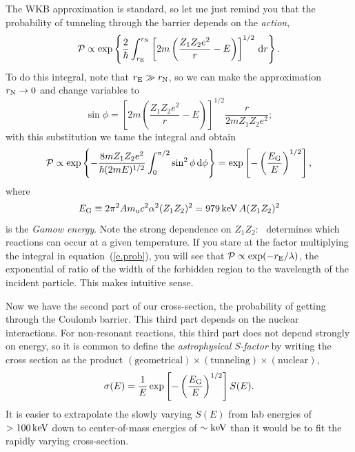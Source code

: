 The WKB approximation is standard, so let me just remind you that the probability of tunneling through the barrier depends on the \emph{action},
\begin{equation}\label{e.wkb}
\mathcal{P} \propto \exp\left\{\frac{2}{\hbar}\int_{r_{\mathrm{E}}}^{r_{\mathrm{N}}}\left[2m\left(\frac{Z_{1}Z_{2}e^{2}}{r}-E\right) \right]^{1/2}\,\mathrm{d} r\right\}.
\end{equation}
To do this integral, note that $r_{\mathrm{E}}\gg r_{\mathrm{N}}$, so we can make the approximation $r_{\mathrm{N}}\to 0$ and change variables to
\[
\sin\phi = \left[2m\left(\frac{Z_{1}Z_{2}e^{2}}{r}-E\right) \right]^{1/2}\frac{r}{2mZ_{1}Z_{2}e^{2}};
\]
with this substitution we tame the integral and obtain
\begin{equation}\label{e.prob}
\mathcal{P} \propto \exp\left\{-\frac{8mZ_{1}Z_{2}e^{2}}{\hbar(2mE)^{1/2}}\int_{0}^{\pi/2}\sin^{2}\phi\,\mathrm{d}\phi\right\} = \exp\left[-\left(\frac{E_{\mathrm{G}}}{E}\right)^{1/2}\right],
\end{equation}
where
\begin{equation}\label{e.EGamow}
E_{\mathrm{G}}\equiv 2\pi^{2} A m_\mathrm{u} c^{2} \alpha^{2} (Z_{1}Z_{2})^{2} = 979\,\mathrm{k}\mathrm{eV} \, A (Z_{1}Z_{2})^{2}
\end{equation}
is the \emph{Gamow energy}.  Note the strong dependence on $Z_{1}Z_{2}$: \EG\ determines which reactions can occur at a given temperature. If you stare at the factor multiplying the integral in equation~(\ref{e.prob}), you will see that $\mathcal{P}\propto \exp(-r_{\mathrm{E}}/\lambda)$, the exponential of ratio of the width of the forbidden region to the wavelength of the incident particle. This makes intuitive sense.

Now we have the second part of our cross-section, the probability of getting through the Coulomb barrier.  This third part depends on the nuclear interactions.  For non-resonant reactions, this third part does not depend strongly on energy, so it is common to define the \emph{astrophysical S-factor} by writing the cross section as the product $(\textrm{geometrical})\times(\textrm{tunneling})\times(\textrm{nuclear})$, 
\begin{equation}\label{e.s-def}
\sigma(E) = \frac{1}{E}\exp\left[-\left(\frac{E_{\mathrm{G}}}{E}\right)^{1/2}\right] S(E).
\end{equation}
It is easier to extrapolate the slowly varying $S(E)$ from lab energies of $> 100\,\mathrm{k}\mathrm{eV}$ down to center-of-mass energies of $\sim \mathrm{k}\mathrm{eV}$ than it would be to fit the rapidly varying cross-section.

